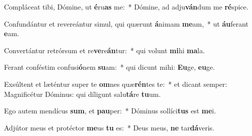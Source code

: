 \item Compláceat tibi, Dómine, ut \textbf{é}ru\textbf{as} me:~* Dómine, ad adju\textbf{ván}dum me \textbf{ré}spice.
\item Confundántur et revereántur simul, qui quærunt \textbf{á}nimam \textbf{me}am,~* ut \textbf{áu}ferant \textbf{e}am.
\item Convertántur retrórsum et re\textbf{ve}re\textbf{án}tur:~* qui volunt \textbf{mi}hi \textbf{ma}la.
\item Ferant conféstim confusi\textbf{ó}nem \textbf{su}am:~* qui dicunt mihi: \textbf{Eu}ge, \textbf{eu}ge.
\item Exsúltent et læténtur super te \textbf{om}nes quæ\textbf{rén}tes te:~* et dicant semper: Magnificétur Dóminus: qui díligunt salu\textbf{tá}re \textbf{tu}um.
\item Ego autem mendícus \textbf{sum}, et \textbf{pau}per:~* Dóminus sollíci\textbf{tus} est \textbf{me}i.
\item Adjútor meus et protéctor \textbf{me}us \textbf{tu} es:~* Deus meus, \textbf{ne} tar\textbf{dá}veris.
